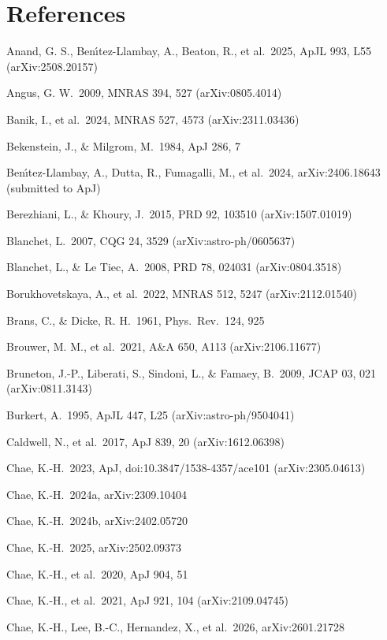 \documentclass[
  10pt,
]{article}
\begin{document}
\section{References}\label{references}

{\small
\begin{list}{}{\setlength{\leftmargin}{1.5em}\setlength{\itemindent}{-1.5em}\setlength{\itemsep}{1pt}\setlength{\parsep}{0pt}}
\item Anand, G. S., Ben\'{\i}tez-Llambay, A., Beaton, R., et al.\ 2025, ApJL 993, L55 (arXiv:2508.20157)
\item Angus, G. W.\ 2009, MNRAS 394, 527 (arXiv:0805.4014)
\item Banik, I., et al.\ 2024, MNRAS 527, 4573 (arXiv:2311.03436)
\item Bekenstein, J., \& Milgrom, M.\ 1984, ApJ 286, 7
\item Ben\'{\i}tez-Llambay, A., Dutta, R., Fumagalli, M., et al.\ 2024, arXiv:2406.18643 (submitted to ApJ)
\item Berezhiani, L., \& Khoury, J.\ 2015, PRD 92, 103510 (arXiv:1507.01019)
\item Blanchet, L.\ 2007, CQG 24, 3529 (arXiv:astro-ph/0605637)
\item Blanchet, L., \& Le Tiec, A.\ 2008, PRD 78, 024031 (arXiv:0804.3518)
\item Borukhovetskaya, A., et al.\ 2022, MNRAS 512, 5247 (arXiv:2112.01540)
\item Brans, C., \& Dicke, R. H.\ 1961, Phys.\ Rev.\ 124, 925
\item Brouwer, M. M., et al.\ 2021, A\&A 650, A113 (arXiv:2106.11677)
\item Bruneton, J.-P., Liberati, S., Sindoni, L., \& Famaey, B.\ 2009, JCAP 03, 021 (arXiv:0811.3143)
\item Burkert, A.\ 1995, ApJL 447, L25 (arXiv:astro-ph/9504041)
\item Caldwell, N., et al.\ 2017, ApJ 839, 20 (arXiv:1612.06398)
\item Chae, K.-H.\ 2023, ApJ, doi:10.3847/1538-4357/ace101 (arXiv:2305.04613)
\item Chae, K.-H.\ 2024a, arXiv:2309.10404
\item Chae, K.-H.\ 2024b, arXiv:2402.05720
\item Chae, K.-H.\ 2025, arXiv:2502.09373
\item Chae, K.-H., et al.\ 2020, ApJ 904, 51
\item Chae, K.-H., et al.\ 2021, ApJ 921, 104 (arXiv:2109.04745)
\item Chae, K.-H., Lee, B.-C., Hernandez, X., et al.\ 2026, arXiv:2601.21728

\end{list}}
\end{document}
